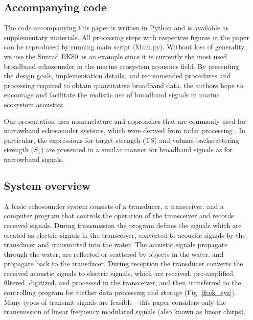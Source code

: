 \documentclass[preprint,12pt,TurnOnLineNumbers]{JASAnew}
\newcommand{\ts}{\textrm{TS}}
\newcommand{\sv}{S_{\textrm{v}}}
\begin{document}
\subsection{Accompanying code}
The code accompanying this paper is written in Python and is available as supplementary materials. All processing steps with respective figures in the paper can be reproduced by running main script (Main.py). Without loss of generality, we use the Simrad EK80 as an example since it is currently the most used broadband echosounder in the marine ecosystem acoustics field. By presenting the design goals, implementation details, and recommended procedures and processing required to obtain quantitative broadband data, the authors hope to encourage and facilitate the realistic use of broadband signals in marine ecosystem acoustics.

Our presentation uses nomenclature and approaches that are commonly used for narrowband echosounder systems, which were derived from radar processing \citep{cook1967}. In particular, the expressions for target strength ($\ts$) and volume backscattering strength ($\sv$) \citep{MacLennan2002consistent} are presented in a similar manner for broadband signals as for narrowband signals.

\subsection{System overview}
A basic echosounder system consists of a transducer, a transceiver, and a computer program that controls the operation of the transceiver and records received signals. During transmission the program defines the signals which are created as electric signals in the transceiver, converted to acoustic signals by the transducer and transmitted into the water. The acoustic signals propagate through the water, are reflected or scattered by objects in the water, and propagate back to the transducer. During reception the transducer converts the received acoustic signals to electric signals, which are received, pre-amplified, filtered, digitized, and processed in the transceiver, and then transferred to the controlling program for further data processing and storage (Fig. \ref{fi:ek_sys}). Many types of transmit signals are feasible - this paper considers only the transmission of linear frequency modulated signals (also known as linear chirps).
\end{document}
